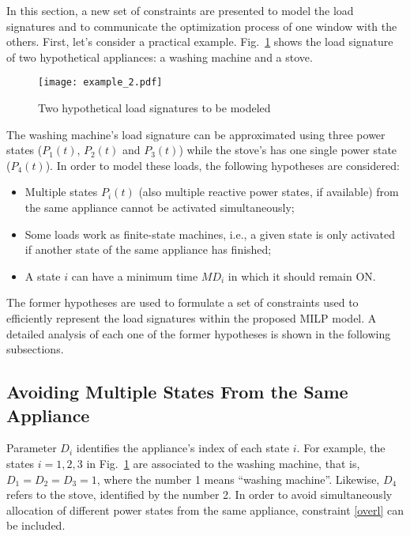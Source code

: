 In this section, a new set of constraints are presented to model the load signatures and to communicate the optimization process of one window with the others. First, let's consider a practical example. Fig.~\ref{example} shows the load signature of two hypothetical appliances: a washing machine and a stove.

\begin{figure}[tb]
    \centering
    \texttt{[image: example\_2.pdf]}
    \caption{Two hypothetical load signatures to be modeled}
    \label{example}
\end{figure}

The washing machine's load signature can be approximated using three power states ($P_1(t)$, $P_2(t)$ and $P_3(t)$) while the stove's has one single power state ($P_4(t)$). In order to model these loads, the following hypotheses are considered: 

\begin{itemize}

\item Multiple states $P_i(t)$ (also multiple reactive power states, if available) from the same appliance cannot be activated simultaneously;
\item Some loads work as finite-state machines, i.e., a given state is only activated if another state of the same appliance has finished;
\item A state $i$ can have a minimum time $MD_i$ in which it should remain ON.

\end{itemize}

The former hypotheses are used to formulate a set of constraints used to efficiently represent the load signatures within the proposed MILP model. A detailed analysis of each one of the former hypotheses is shown in the following subsections.

\subsection{Avoiding Multiple States From the Same Appliance}

Parameter $D_i$ identifies the appliance's index of each state $i$. For example, the states $i = 1, 2, 3$ in Fig.~\ref{example} are associated to the washing machine, that is, $D_1 = D_2 = D_3 = 1$, where the number 1 means ``washing machine''. Likewise, $D_4$ refers to the stove, identified by the number 2. In order to avoid simultaneously allocation of different power states from the same appliance, constraint \eqref{overl} can be included.

